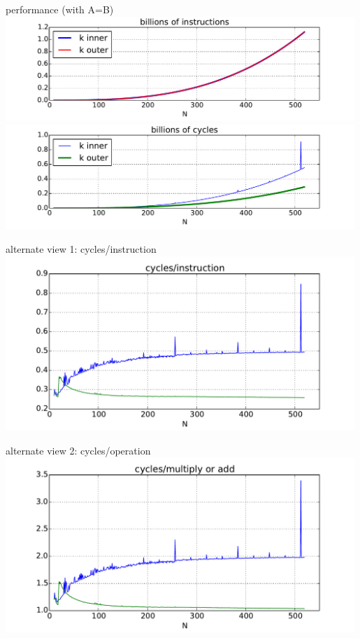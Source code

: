 
\begin{frame}{performance (with A=B)}
\includegraphics[width=0.99\textwidth]{../caching/k-inout-instrs} \\
\includegraphics[width=0.99\textwidth]{../caching/k-inout-cycles}
\end{frame}

\begin{frame}{alternate view 1: cycles/instruction}
\includegraphics[width=0.99\textwidth]{../caching/k-inout-cpi}
\end{frame}

\begin{frame}{alternate view 2: cycles/operation}
\includegraphics[width=0.99\textwidth]{../caching/k-inout-cpe}
\end{frame}
